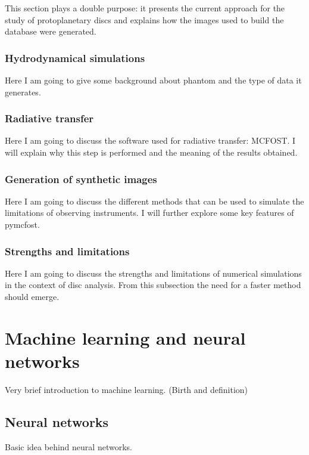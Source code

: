 \documentclass[a4paper,10pt]{report}
\begin{document}
This section plays a double purpose: it presents the current approach for
the study of protoplanetary discs and explains how the images used to build the 
database were generated.

\subsection{Hydrodynamical simulations}

Here I am going to give some background about phantom and the type of 
data it generates.

\subsection{Radiative transfer}

Here I am going to discuss the software used for radiative transfer: MCFOST.
I will explain why this step is performed and the meaning of the results obtained.

\subsection{Generation of synthetic images}

Here I am going to discuss the different methods that can be used to simulate the limitations 
of observing instruments. I will further explore some key features of pymcfost.

\subsection{Strengths and limitations}

Here I am going to discuss the strengths and limitations of numerical simulations in the context of 
disc analysis. From this subsection the need for a faster method should emerge.

\chapter{Machine learning and neural networks}

Very brief introduction to machine learning. (Birth and definition)

\section{Neural networks}

Basic idea behind neural networks.
\end{document}
